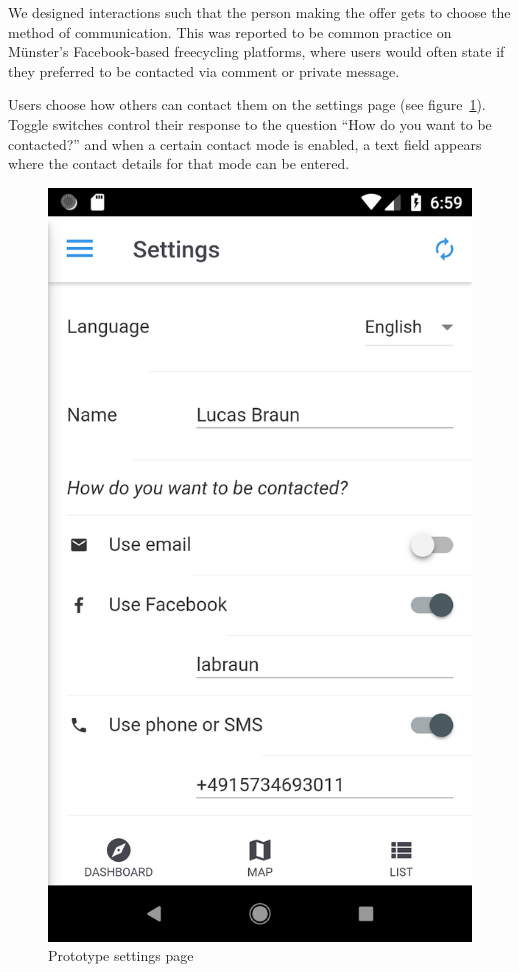 We designed interactions such that the person making the offer gets to choose the method of communication. This was reported to be common practice on Münster's Facebook-based freecycling platforms, where users would often state if they preferred to be contacted via comment or private message.

Users choose how others can contact them on the settings page (see figure~\ref{fig:scr_settings}). Toggle switches control their response to the question ``How do you want to be contacted?'' and when a certain contact mode is enabled, a text field appears where the contact details for that mode can be entered.

\begin{figure}[ht]
  \centering
  \includegraphics[scale=0.25]{images/screenshots/screenshot_settings.png}
  \caption{Prototype settings page}
  \label{fig:scr_settings}
\end{figure}

